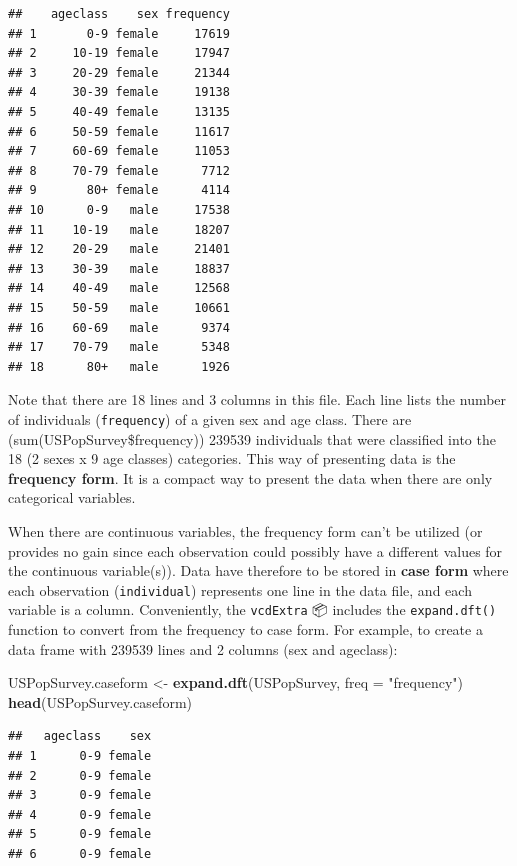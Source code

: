 \documentclass[
  12pt,
]{book}
\newenvironment{Shaded}{\begin{snugshade}}{\end{snugshade}}
\newcommand{\DataTypeTok}[1]{\textcolor[rgb]{0.13,0.29,0.53}{#1}}
\newcommand{\KeywordTok}[1]{\textcolor[rgb]{0.13,0.29,0.53}{\textbf{#1}}}
\newcommand{\NormalTok}[1]{#1}
\newcommand{\StringTok}[1]{\textcolor[rgb]{0.31,0.60,0.02}{#1}}
\begin{document}
\begin{verbatim}
##    ageclass    sex frequency
## 1       0-9 female     17619
## 2     10-19 female     17947
## 3     20-29 female     21344
## 4     30-39 female     19138
## 5     40-49 female     13135
## 6     50-59 female     11617
## 7     60-69 female     11053
## 8     70-79 female      7712
## 9       80+ female      4114
## 10      0-9   male     17538
## 11    10-19   male     18207
## 12    20-29   male     21401
## 13    30-39   male     18837
## 14    40-49   male     12568
## 15    50-59   male     10661
## 16    60-69   male      9374
## 17    70-79   male      5348
## 18      80+   male      1926
\end{verbatim}

Note that there are 18 lines and 3 columns in this file. Each line lists the number of individuals (\texttt{frequency}) of a given sex and age class. There are (sum(USPopSurvey\$frequency)) 239539 individuals that were classified into the 18 (2 sexes x 9 age classes) categories. This way of presenting data is the \textbf{frequency form}. It is a compact way to present the data when there are only categorical variables.

When there are continuous variables, the frequency form can't be utilized (or provides no gain since each observation could possibly have a different values for the continuous variable(s)). Data have therefore to be stored in \textbf{case form} where each observation (\texttt{individual}) represents one line in the data file, and each variable is a column. Conveniently, the \texttt{vcdExtra} 📦 includes the \texttt{expand.dft()} function to convert from the frequency to case form. For example, to create a data frame with 239539 lines and 2 columns (sex and ageclass):

\begin{Shaded}
\begin{Highlighting}[]
\NormalTok{USPopSurvey.caseform \textless{}{-}}\StringTok{ }\KeywordTok{expand.dft}\NormalTok{(USPopSurvey, }\DataTypeTok{freq =} \StringTok{"frequency"}\NormalTok{)}
\KeywordTok{head}\NormalTok{(USPopSurvey.caseform)}
\end{Highlighting}
\end{Shaded}

\begin{verbatim}
##   ageclass    sex
## 1      0-9 female
## 2      0-9 female
## 3      0-9 female
## 4      0-9 female
## 5      0-9 female
## 6      0-9 female
\end{verbatim}
\end{document}
